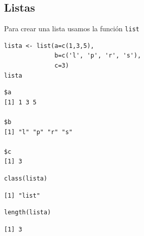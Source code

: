 \documentclass[xcolor={usenames,svgnames,dvipsnames}]{beamer}
\begin{document}
\subsection{Listas}
\label{sec:org0b0b216}
\begin{frame}[fragile,label={sec:orgf0ced02}]{Para crear una lista usamos la función \texttt{list}}
 \lstset{language=r,label= ,caption= ,captionpos=b,numbers=none}
\begin{lstlisting}
lista <- list(a=c(1,3,5),
              b=c('l', 'p', 'r', 's'),
              c=3)
lista
\end{lstlisting}

\begin{verbatim}
$a
[1] 1 3 5

$b
[1] "l" "p" "r" "s"

$c
[1] 3
\end{verbatim}

\lstset{language=r,label= ,caption= ,captionpos=b,numbers=none}
\begin{lstlisting}
class(lista)
\end{lstlisting}

\begin{verbatim}
[1] "list"
\end{verbatim}

\lstset{language=r,label= ,caption= ,captionpos=b,numbers=none}
\begin{lstlisting}
length(lista)
\end{lstlisting}

\begin{verbatim}
[1] 3
\end{verbatim}
\end{frame}
\end{document}
